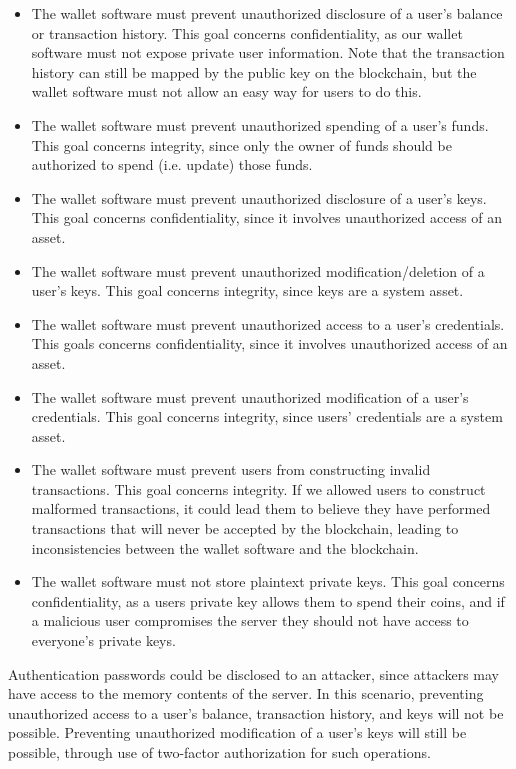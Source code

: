 \documentclass[12pt]{article}
\begin{document}
\begin{itemize}
\item The wallet software must prevent unauthorized disclosure of a user's balance or transaction history. This goal concerns confidentiality, as our wallet software must not expose private user information. Note that the transaction history can still be mapped by the public key on the blockchain, but the wallet software must not allow an easy way for users to do this.
\item The wallet software must prevent unauthorized spending of a user's funds. This goal concerns integrity, since only the owner of funds should be authorized to spend (i.e. update) those funds.
\item The wallet software must prevent unauthorized disclosure of a user's keys. This goal concerns confidentiality, since it involves unauthorized access of an asset.
\item The wallet software must prevent unauthorized modification/deletion of a user's keys. This goal concerns integrity, since keys are a system asset.
\item The wallet software must prevent unauthorized access to a user's credentials. This goals concerns confidentiality, since it involves unauthorized access of an asset.
\item The wallet software must prevent unauthorized modification of a user's credentials. This goal concerns integrity, since users' credentials are a system asset.
\item The wallet software must prevent users from constructing invalid transactions. This goal concerns integrity. If we allowed users to construct malformed transactions, it could lead them to believe they have performed transactions that will never be accepted by the blockchain, leading to inconsistencies between the wallet software and the blockchain.
\item The wallet software must not store plaintext private keys. This goal concerns confidentiality, as a users private key allows them to spend their coins, and if a malicious user compromises the server they should not have access to everyone's private keys.
\end{itemize}

Authentication passwords could be disclosed to an attacker, since attackers may have access to the memory contents of the server. In this scenario, preventing unauthorized access to a user's balance, transaction history, and keys will not be possible. Preventing unauthorized modification of a user's keys will still be possible, through use of two-factor authorization for such operations.
\end{document}
